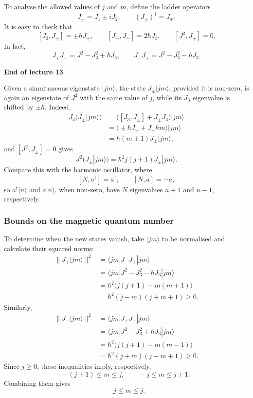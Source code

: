 \documentclass[11pt,a4paper]{article}
\begin{document}
To analyse the allowed values of $j$ and $m$, define the ladder operators
\[
    J_\pm=J_1\pm iJ_2,\qquad (J_\pm)^\dagger=J_\mp.
\]
It is easy to check that
\[
    [J_3,J_\pm]=\pm\hbar J_\pm,
    \qquad [J_+,J_-]=2\hbar J_3,
    \qquad [J^2,J_\pm]=0.
\]
In fact,
\[
    J_+J_-=J^2-J_3^2+\hbar J_3,
    \qquad
    J_-J_+=J^2-J_3^2-\hbar J_3.
\]

\begin{center}
    \textbf{End of lecture 13}
\end{center}
\clearpage
Given a simultaneous eigenstate $|jm\rangle$, the state
$J_\pm|jm\rangle$, provided it is non-zero, is again an eigenstate of
$J^2$ with the same value of $j$, while its $J_3$ eigenvalue is shifted
by $\pm\hbar$. Indeed,
\begin{align*}
    J_3\bigl(J_\pm|jm\rangle\bigr)
      &=\bigl([J_3,J_\pm]+J_\pm J_3\bigr)|jm\rangle\\
      &=\bigl(\pm\hbar J_\pm+J_\pm\hbar m\bigr)|jm\rangle\\
      &=\hbar(m\pm1)J_\pm|jm\rangle,
\end{align*}
and $[J^2,J_\pm]=0$ gives
\[
    J^2\bigl(J_\pm|jm\rangle\bigr)
       =\hbar^2j(j+1)J_\pm|jm\rangle.
\]
Compare this with the harmonic oscillator, where
\[
    [N,a^\dagger]=a^\dagger,\qquad [N,a]=-a,
\]
so $a^\dagger|n\rangle$ and $a|n\rangle$, when non-zero, have
$N$ eigenvalues $n+1$ and $n-1$, respectively.

\subsubsection*{Bounds on the magnetic quantum number}

To determine when the new states vanish, take $|jm\rangle$ to be
normalised and calculate their squared norms:
\begin{align*}
    \|J_+|jm\rangle\|^2
      &=\langle jm|J_-J_+|jm\rangle\\
      &=\langle jm|J^2-J_3^2-\hbar J_3|jm\rangle\\
      &=\hbar^2\bigl(j(j+1)-m(m+1)\bigr)\\
      &=\hbar^2(j-m)(j+m+1)\ge0.
\end{align*}
Similarly,
\begin{align*}
    \|J_-|jm\rangle\|^2
      &=\langle jm|J_+J_-|jm\rangle\\
      &=\langle jm|J^2-J_3^2+\hbar J_3|jm\rangle\\
      &=\hbar^2\bigl(j(j+1)-m(m-1)\bigr)\\
      &=\hbar^2(j+m)(j-m+1)\ge0.
\end{align*}
Since $j\ge0$, these inequalities imply, respectively,
\[
    -(j+1)\le m\le j,\qquad -j\le m\le j+1.
\]
Combining them gives
\[
    \boxed{-j\le m\le j.}
\]
\end{document}
